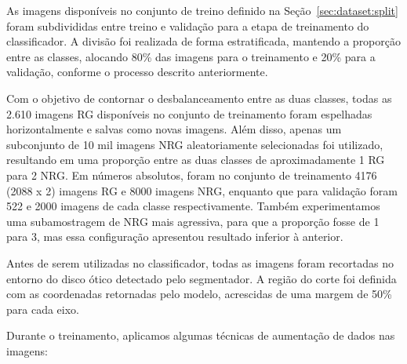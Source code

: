 \documentclass[12pt]{article}
\begin{document}
As imagens disponíveis no conjunto de treino definido na Seção~\ref{sec:dataset:split} foram subdivididas entre treino e validação para a etapa de treinamento do classificador. A divisão foi realizada de forma estratificada, mantendo a proporção entre as classes, alocando 80\% das imagens para o treinamento e 20\% para a validação, conforme o processo descrito anteriormente.



Com o objetivo de contornar o desbalanceamento entre as duas classes, todas as 2.610 imagens RG disponíveis no conjunto de treinamento foram espelhadas horizontalmente e salvas como novas imagens. Além disso, apenas um subconjunto de 10 mil imagens NRG aleatoriamente selecionadas foi utilizado, resultando em uma proporção entre as duas classes de aproximadamente 1 RG para 2 NRG. Em números absolutos, foram no conjunto de treinamento 4176 (2088 x 2) imagens RG e 8000 imagens NRG, enquanto que para validação foram 522 e 2000 imagens de cada classe respectivamente. Também experimentamos uma subamostragem de NRG mais agressiva, para que a proporção fosse de 1 para 3, mas essa configuração apresentou resultado inferior à anterior.

Antes de serem utilizadas no classificador, todas as imagens foram recortadas no entorno do disco ótico detectado pelo segmentador. A região do corte foi definida com as coordenadas retornadas pelo modelo, acrescidas de uma margem de 50\% para cada eixo.


Durante o treinamento, aplicamos algumas técnicas de aumentação de dados nas imagens:
\end{document}
